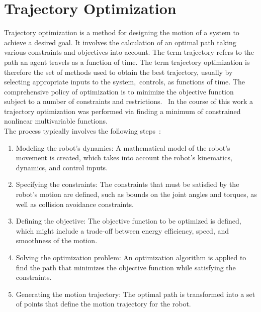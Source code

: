 \section{Trajectory Optimization}
\label{sec:trajectory-optimization}

    Trajectory optimization is a method for designing the motion of a system to achieve a desired goal. It involves the calculation of an optimal path taking  various constraints and objectives into account. The term trajectory refers to the path an agent travels as a function of time. The term trajectory optimization is therefore the set of methods used to obtain the best trajectory, usually by selecting appropriate inputs to the system,~\ie controls, as functions of time. The comprehensive policy of optimization is to minimize the objective function subject to a number of constraints and restrictions.~\cite{Kelly2017} In the course of this work a trajectory optimization was performed via finding a minimum of constrained nonlinear multivariable functions.\\ %

    The process typically involves the following steps~\cite{Kelly2017}:
    \begin{enumerate}
        \item Modeling the robot's dynamics: A mathematical model of the robot's movement is created, which takes into account the robot's kinematics, dynamics, and control inputs.
        \item Specifying the constraints: The constraints that must be satisfied by the robot's motion are defined, such as bounds on the joint angles and torques, as well as collision avoidance constraints.
        \item Defining the objective: The objective function to be optimized is defined, which might include a trade-off between energy efficiency, speed, and smoothness of the motion.
        \item Solving the optimization problem: An optimization algorithm is applied to find the path that minimizes the objective function while satisfying the constraints.
        \item Generating the motion trajectory: The optimal path is transformed into a set of points that define the motion trajectory for the robot.
    \end{enumerate}
    
